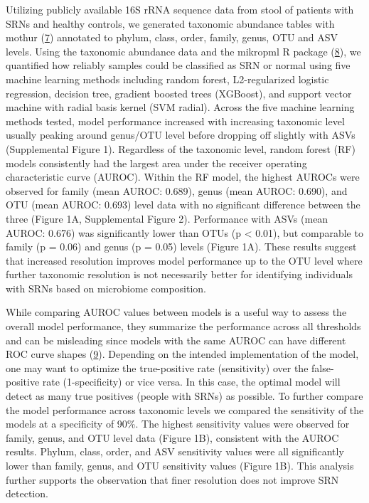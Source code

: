 \documentclass[
]{article}
\begin{document}
Utilizing publicly available 16S rRNA sequence data from stool of
patients with SRNs and healthy controls, we generated taxonomic
abundance tables with mothur (\protect\hyperlink{ref-schloss2009}{7})
annotated to phylum, class, order, family, genus, OTU and ASV levels.
Using the taxonomic abundance data and the mikropml R package
(\protect\hyperlink{ref-topuxe7uolu2021}{8}), we quantified how reliably
samples could be classified as SRN or normal using five machine learning
methods including random forest, L2-regularized logistic regression,
decision tree, gradient boosted trees (XGBoost), and support vector
machine with radial basis kernel (SVM radial). Across the five machine
learning methods tested, model performance increased with increasing
taxonomic level usually peaking around genus/OTU level before dropping
off slightly with ASVs (Supplemental Figure 1). Regardless of the
taxonomic level, random forest (RF) models consistently had the largest
area under the receiver operating characteristic curve (AUROC). Within
the RF model, the highest AUROCs were observed for family (mean AUROC:
0.689), genus (mean AUROC: 0.690), and OTU (mean AUROC: 0.693) level
data with no significant difference between the three (Figure 1A,
Supplemental Figure 2). Performance with ASVs (mean AUROC: 0.676) was
significantly lower than OTUs (p \textless{} 0.01), but comparable to
family (p = 0.06) and genus (p = 0.05) levels (Figure 1A). These results
suggest that increased resolution improves model performance up to the
OTU level where further taxonomic resolution is not necessarily better
for identifying individuals with SRNs based on microbiome composition.

While comparing AUROC values between models is a useful way to assess
the overall model performance, they summarize the performance across all
thresholds and can be misleading since models with the same AUROC can
have different ROC curve shapes (\protect\hyperlink{ref-lobo2008}{9}).
Depending on the intended implementation of the model, one may want to
optimize the true-positive rate (sensitivity) over the false-positive
rate (1-specificity) or vice versa. In this case, the optimal model will
detect as many true positives (people with SRNs) as possible. To further
compare the model performance across taxonomic levels we compared the
sensitivity of the models at a specificity of 90\%. The highest
sensitivity values were observed for family, genus, and OTU level data
(Figure 1B), consistent with the AUROC results. Phylum, class, order,
and ASV sensitivity values were all significantly lower than family,
genus, and OTU sensitivity values (Figure 1B). This analysis further
supports the observation that finer resolution does not improve SRN
detection.
\end{document}
